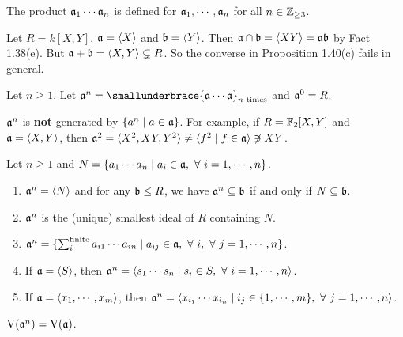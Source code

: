 \begin{remark}
    The product $\mathfrak{a}_1 \cdots \mathfrak{a}_n$ is defined for $\mathfrak{a}_1,\cdots,\mathfrak{a}_n$ for all $n \in \mathbb{Z}_{\geq 3}$.
\end{remark}

\begin{example}
    Let $R = k[X,Y]$, $\mathfrak{a} = \langle X \rangle$ and $\mathfrak{b} = \langle Y \rangle$. Then $\mathfrak{a} \cap \mathfrak{b} = \langle XY \rangle = \mathfrak{a} \mathfrak{b}$ by Fact 1.38(e). But $\mathfrak{a} + \mathfrak{b} = \langle X,Y \rangle \subsetneq R$. So the converse in Proposition 1.40(c) fails in general.
\end{example}

\begin{definition}
    Let $n \geq 1$. Let $\ffa^n = \smallunderbrace{\ffa \cdots \ffa}_{n\text{ times}}$ and $\mathfrak{a}^0 = R$.
\end{definition}

\begin{warning}
    $\mathfrak{a}^n$ is \textbf{not} generated by $\{a^n \mid a \in \mathfrak{a}\}$. For example, if $R = \mathbb{F}_2[X,Y]$ and $\mathfrak{a} = \langle X,Y \rangle$, then $\mathfrak{a}^2 = \langle X^2,XY,Y^2 \rangle \neq \langle f^2 \mid f \in \mathfrak{a} \rangle \not \ni XY$.
\end{warning}

\begin{fact}
    Let $n \geq 1$ and $N = \{a_1 \cdots a_n \mid a_i \in \mathfrak{a}, \ \forall \  i = 1,\cdots,n\}$.
    \begin{enumerate}
        \item
            $\mathfrak{a}^n = \langle N \rangle$ and for any $\mathfrak{b} \leq R$, we have $\mathfrak{a}^n \subseteq \mathfrak{b}$ if and only if $N \subseteq \mathfrak{b}$.
        \item 
            $\mathfrak{a}^n$ is the (unique) smallest ideal of $R$ containing $N$.
        \item $\mathfrak{a}^n = \{\sum_{i}^{\text{finite}}a_{i1} \cdots a_{in} \mid a_{ij} \in \mathfrak{a}, \ \forall \  i, \ \forall \  j = 1,\cdots,n\}$.
        \item If $\mathfrak{a} = \langle S \rangle$, then $\mathfrak{a}^n = \langle s_1 \cdots s_n \mid s_i \in S, \ \forall \  i = 1,\cdots,n\rangle$.
        \item 
            If $\mathfrak{a} = \langle x_1,\cdots,x_m \rangle$, then $\mathfrak{a}^n = \langle x_{i_1} \cdots x_{i_n} \mid i_j \in \{1,\cdots,m\}, \ \forall \  j = 1,\cdots,n \rangle$.
    \end{enumerate}
\end{fact}

\begin{fact}
    $\operatorname{V}(\mathfrak{a}^n) = \operatorname{V}(\mathfrak{a})$.
\end{fact}


